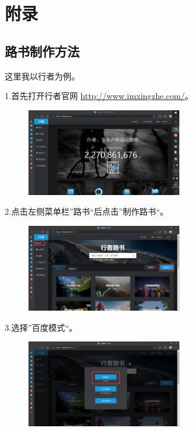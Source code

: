 \documentclass{ctexbook}
\begin{document}
\chapter{附录}
\section{路书制作方法}
\label{chapter：路书制作方法}
这里我以行者为例。

1.首先打开行者官网 \href{http://www.imxingzhe.com/}{http://www.imxingzhe.com/}。

        \begin{figure}[H]
            \begin{center}
            \includegraphics[width=0.6\textwidth]{fig/行者1}
            \end{center}
        \end{figure}

2.点击左侧菜单栏''路书``后点击''制作路书``。
       \begin{figure}[H]
            \begin{center}
            \includegraphics[width=0.6\textwidth]{fig/行者2}
            \end{center}
        \end{figure}

3.选择''百度模式``。
       \begin{figure}[H]
            \begin{center}
            \includegraphics[width=0.6\textwidth]{fig/行者3}
            \end{center}
        \end{figure}
\end{document}

